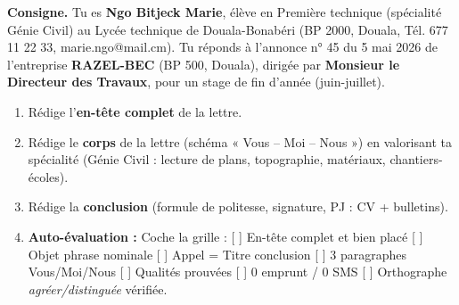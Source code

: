 \documentclass[11pt]{article}
\begin{document}
\begin{exercice}
\textbf{Consigne.} Tu es \textbf{Ngo Bitjeck Marie}, élève en Première technique (spécialité Génie Civil) au Lycée technique de Douala-Bonabéri (BP 2000, Douala, Tél. 677 11 22 33, marie.ngo@mail.cm). Tu réponds à l'annonce n° 45 du 5 mai 2026 de l'entreprise \textbf{RAZEL-BEC} (BP 500, Douala), dirigée par \textbf{Monsieur le Directeur des Travaux}, pour un stage de fin d'année (juin-juillet).
\begin{enumerate}
\item Rédige l'\textbf{en-tête complet} de la lettre.
\item Rédige le \textbf{corps} de la lettre (schéma « Vous – Moi – Nous ») en valorisant ta spécialité (Génie Civil : lecture de plans, topographie, matériaux, chantiers-écoles).
\item Rédige la \textbf{conclusion} (formule de politesse, signature, PJ : CV + bulletins).
\item \textbf{Auto-évaluation :} Coche la grille : [ ] En-tête complet et bien placé [ ] Objet phrase nominale [ ] Appel = Titre conclusion [ ] 3 paragraphes Vous/Moi/Nous [ ] Qualités prouvées [ ] 0 emprunt / 0 SMS [ ] Orthographe \emph{agréer/distinguée} vérifiée.
\end{enumerate}
\end{exercice}
\end{document}
